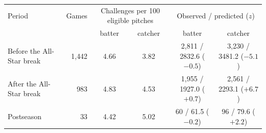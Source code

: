 \begin{tabular}{lrcccc}
\toprule
Period & Games & \multicolumn{2}{c}{Challenges per 100 eligible pitches} & \multicolumn{2}{c}{Observed / predicted ($z$)} \\
 & & batter & catcher & batter & catcher \\
\midrule
Before the All-Star break & 1{,}442 & 4.66 & 3.82 & 2{,}811 / 2832.6 ($-0.5$) & 3{,}230 / 3481.2 ($-5.1$) \\
After the All-Star break & 983 & 4.83 & 4.53 & 1{,}955 / 1927.0 ($+0.7$) & 2{,}561 / 2293.1 ($+6.7$) \\
Postseason & 33 & 4.42 & 5.02 & 60 / 61.5 ($-0.2$) & 96 / 79.6 ($+2.2$) \\
\bottomrule
\end{tabular}
